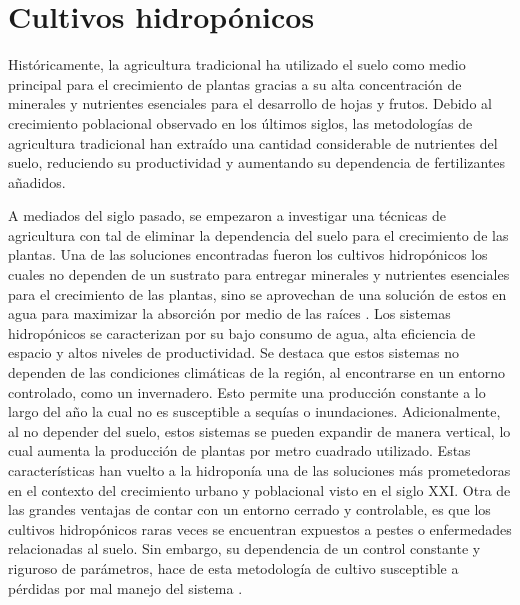 \section{Cultivos hidropónicos}
Históricamente, la agricultura tradicional ha utilizado el suelo como medio principal para el crecimiento de plantas gracias a su alta concentración de minerales y nutrientes esenciales para el desarrollo de hojas y frutos. Debido al crecimiento poblacional observado en los últimos siglos, las metodologías de agricultura tradicional han extraído una cantidad considerable de nutrientes del suelo, reduciendo su productividad y aumentando su dependencia de fertilizantes añadidos. 

A mediados del siglo pasado, se empezaron a investigar una técnicas de agricultura con tal de eliminar la dependencia del suelo para el crecimiento de las plantas. Una de las soluciones encontradas fueron los cultivos hidropónicos los cuales no dependen de un sustrato para entregar minerales y nutrientes esenciales para el crecimiento de las plantas, sino se aprovechan de una solución de estos en agua para maximizar la absorción por medio de las raíces \cite{raviv_soilless_2019}. Los sistemas hidropónicos se caracterizan por su bajo consumo de agua, alta eficiencia de espacio y altos niveles de productividad. Se destaca que estos sistemas no dependen de las condiciones climáticas de la región, al encontrarse en un entorno controlado, como un invernadero. Esto permite una producción constante a lo largo del año la cual no es susceptible a sequías o inundaciones. Adicionalmente, al no depender del suelo, estos sistemas se pueden expandir de manera vertical, lo cual aumenta la producción de plantas por metro cuadrado utilizado. Estas características han vuelto a la hidroponía una de las soluciones más prometedoras en el contexto del crecimiento urbano y poblacional visto en el siglo XXI. Otra de las grandes ventajas de contar con un entorno cerrado y controlable, es que los cultivos hidropónicos raras veces se encuentran expuestos a pestes o enfermedades relacionadas al suelo. Sin embargo, su dependencia de un control constante y riguroso de parámetros, hace de esta metodología de cultivo susceptible a pérdidas por mal manejo del sistema \cite{raviv_soilless_2019}.

